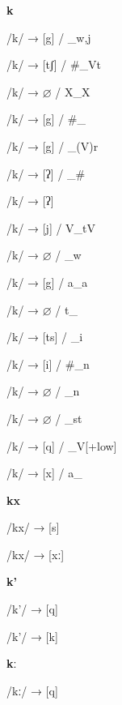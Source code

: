 \begin{center}\textbf{k}\end{center}
\begin{multicols}{4}
\noindent /k/ → [g] / \_{w,j}

\noindent /k/ → [tʃ] / \#\_Vt

\noindent /k/ → $\varnothing$ / X\_X

\noindent /k/ → [g] / \#\_

\noindent /k/ → [g] / \_(V)r

\noindent /k/ → [ʔ] / \_\#

\noindent /k/ → [ʔ]

\noindent /k/ → [j] / V\_tV

\noindent /k/ → $\varnothing$ / \_w

\noindent /k/ → [g] / a\_a

\noindent /k/ → $\varnothing$ / t\_

\noindent /k/ → [ts] / \_i

\noindent /k/ → [i] / \#\_n

\noindent /k/ → $\varnothing$ / \_n

\noindent /k/ → $\varnothing$ / \_st

\noindent /k/ → [q] / \_V[+low]

\noindent /k/ → [x] / a\_

\end{multicols}

\begin{center}\textbf{kx}\end{center}
\begin{multicols}{4}
\noindent /kx/ → [s]

\noindent /kx/ → [xː]

\end{multicols}

\begin{center}\textbf{k'}\end{center}
\begin{multicols}{4}
\noindent /k'/ → [q]

\noindent /k'/ → [k]

\end{multicols}

\begin{center}\textbf{kː}\end{center}
\begin{multicols}{4}
\noindent /kː/ → [q]

\end{multicols}

